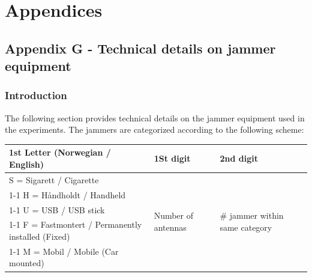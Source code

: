 \documentclass[a4paper]{book}
\begin{document}
\chapter{Appendices}
\section{Appendix G - Technical details on jammer equipment}

\subsection{Introduction}
The following section provides technical details on the jammer equipment used in the experiments. The jammers are categorized according to the following scheme:

\begin{table}[H]
\begin{tabular}{|l|l|l|}
\hline \rowcolor[HTML]{C0C0C0} 
\textbf{1st Letter (Norwegian / English)}    & \textbf{1St digit}                             & \textbf{2nd digit}                     \\
\hline
S = Sigarett / Cigarette            & \multirow{5}{*}{Number of antennas}   & \multirow{5}{*}{\# jammer within same category} \\
\cline{1-1}
H = Håndholdt / Handheld            &                                       &                       \\
\cline{1-1}
U = USB / USB stick                 &                                       &                       \\
\cline{1-1}
F = Fastmontert / Permanently installed (Fixed) &                           &                       \\
\cline{1-1}
M = Mobil / Mobile (Car mounted)    &                                       &                       \\
\hline              
\end{tabular}
\end{table}
\end{document}
